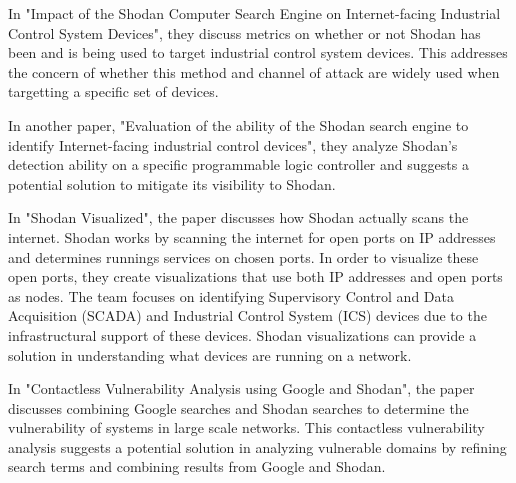 



In "Impact of the Shodan Computer Search Engine on Internet-facing Industrial
Control System Devices"\cite{afit//CSAR-10-025-01}, they discuss metrics
on whether or not Shodan has been and is being used to target industrial control
system devices. This addresses the concern of whether this method and channel of
attack are widely used when targetting a specific set of devices.

In another paper, "Evaluation of the ability of the Shodan search engine to
identify Internet-facing industrial control devices"\cite{bodenheim_shodan_ics},
they analyze Shodan's detection ability on a specific programmable logic controller
and suggests a potential solution to mitigate its visibility to Shodan.

In "Shodan Visualized"\cite{shodan_vis}, the paper discusses how Shodan actually
scans the internet. Shodan works by scanning the internet for open ports on 
IP addresses and determines runnings services on chosen ports. In order to
visualize these open ports, they create visualizations that use both IP addresses
and open ports as nodes. The team focuses on identifying Supervisory Control and
Data Acquisition (SCADA) and Industrial Control System (ICS) devices due to the
infrastructural support of these devices. Shodan visualizations can provide a
solution in understanding what devices are running on a network.

In "Contactless Vulnerability Analysis using Google and Shodan"\cite{google_shodan},
the paper discusses combining Google searches and Shodan searches to determine
the vulnerability of systems in large scale networks. This contactless vulnerability
analysis suggests a potential solution in analyzing vulnerable domains by refining search terms and 
combining results from Google and Shodan.